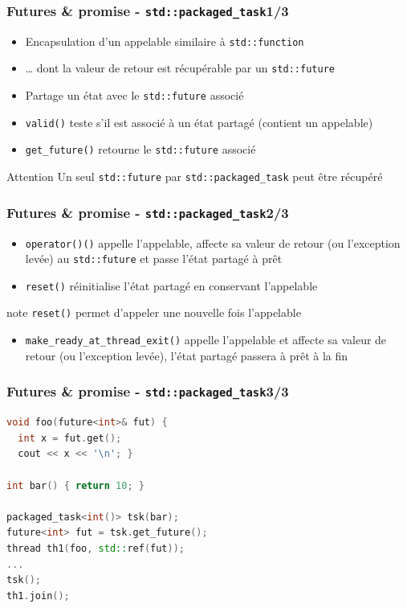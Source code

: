 \documentclass[C++.tex]{subfiles}
\begin{document}
\begin{frame}[fragile]
	\frametitle{Futures \& promise - \lstinline|std::packaged_task|\titlehfill{}1/3}
	\begin{itemize}
		\item Encapsulation d'un appelable similaire à \lstinline|std::function|
		\item \ldots{} dont la valeur de retour est récupérable par un \lstinline|std::future|
		\item Partage un état avec le \lstinline|std::future| associé
		\item \lstinline|valid()| teste s'il est associé à un état partagé (contient un appelable)
		\item \lstinline|get_future()| retourne le \lstinline|std::future| associé
	\end{itemize}

	\begin{alertblock}{Attention}
		Un seul \lstinline|std::future| par \lstinline|std::packaged_task| peut être récupéré
	\end{alertblock}
\end{frame}

\begin{frame}[fragile]
	\frametitle{Futures \& promise - \lstinline|std::packaged_task|\titlehfill{}2/3}
	\begin{itemize}
		\item \lstinline|operator()()| appelle l'appelable, affecte sa valeur de retour (ou l'exception levée) au \lstinline|std::future| et passe l'état partagé à prêt
		\item \lstinline|reset()| réinitialise l'état partagé en conservant l'appelable
	\end{itemize}

	\begin{block}{note}
		\lstinline|reset()| permet d'appeler une nouvelle fois l'appelable
	\end{block}

	\begin{itemize}
		\item \lstinline|make_ready_at_thread_exit()| appelle l'appelable et affecte sa valeur de retour (ou l'exception levée), l'état partagé passera à prêt à la fin
	\end{itemize}
\end{frame}

\begin{frame}[fragile]
	\frametitle{Futures \& promise - \lstinline|std::packaged_task|\titlehfill{}3/3}
	\begin{lstlisting}[language=C++]
void foo(future<int>& fut) {
  int x = fut.get();
  cout << x << '\n'; }

int bar() { return 10; }

packaged_task<int()> tsk(bar);
future<int> fut = tsk.get_future();
thread th1(foo, std::ref(fut));
...
tsk();
th1.join();\end{lstlisting}
\end{frame}
\end{document}
